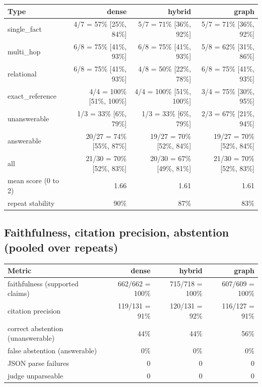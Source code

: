 \begin{center}
\begin{tabular}{lrrr}
\toprule
Type & dense & hybrid & graph \\
\midrule
single\_fact & 4/7 = 57\% [25\%, 84\%] & 5/7 = 71\% [36\%, 92\%] & 5/7 = 71\% [36\%, 92\%] \\
multi\_hop & 6/8 = 75\% [41\%, 93\%] & 6/8 = 75\% [41\%, 93\%] & 5/8 = 62\% [31\%, 86\%] \\
relational & 6/8 = 75\% [41\%, 93\%] & 4/8 = 50\% [22\%, 78\%] & 6/8 = 75\% [41\%, 93\%] \\
exact\_reference & 4/4 = 100\% [51\%, 100\%] & 4/4 = 100\% [51\%, 100\%] & 3/4 = 75\% [30\%, 95\%] \\
unanswerable & 1/3 = 33\% [6\%, 79\%] & 1/3 = 33\% [6\%, 79\%] & 2/3 = 67\% [21\%, 94\%] \\
answerable & 20/27 = 74\% [55\%, 87\%] & 19/27 = 70\% [52\%, 84\%] & 19/27 = 70\% [52\%, 84\%] \\
all & 21/30 = 70\% [52\%, 83\%] & 20/30 = 67\% [49\%, 81\%] & 21/30 = 70\% [52\%, 83\%] \\
mean score (0 to 2) & 1.66 & 1.61 & 1.61 \\
repeat stability & 90\% & 87\% & 83\% \\
\bottomrule
\end{tabular}
\end{center}

\subsection*{Faithfulness, citation precision, abstention (pooled over repeats)}

\begin{center}
\begin{tabular}{lrrr}
\toprule
Metric & dense & hybrid & graph \\
\midrule
faithfulness (supported claims) & 662/662 = 100\% & 715/718 = 100\% & 607/609 = 100\% \\
citation precision & 119/131 = 91\% & 120/131 = 92\% & 116/127 = 91\% \\
correct abstention (unanswerable) & 44\% & 44\% & 56\% \\
false abstention (answerable) & 0\% & 0\% & 0\% \\
JSON parse failures & 0 & 0 & 0 \\
judge unparseable & 0 & 0 & 0 \\
\bottomrule
\end{tabular}
\end{center}

